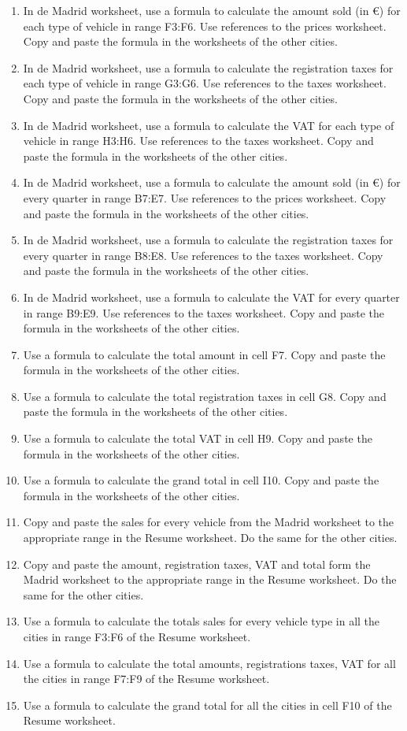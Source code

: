 \begin{enumerate}[leftmargin=*,resume]
\begin{enumerate}
\item In de Madrid worksheet, use a formula to calculate the amount sold (in €) for each type of vehicle in range F3:F6.
Use references to the prices worksheet. 
Copy and paste the formula in the worksheets of the other cities. 
\item In de Madrid worksheet, use a formula to calculate the registration taxes for each type of vehicle in range G3:G6.
Use references to the taxes worksheet. 
Copy and paste the formula in the worksheets of the other cities.
\item In de Madrid worksheet, use a formula to calculate the VAT for each type of vehicle in range H3:H6.
Use references to the taxes worksheet. 
Copy and paste the formula in the worksheets of the other cities.
\item In de Madrid worksheet, use a formula to calculate the amount sold (in €) for every quarter in range
B7:E7.
Use references to the prices worksheet. 
Copy and paste the formula in the worksheets of the other cities.
\item In de Madrid worksheet, use a formula to calculate the registration taxes for every quarter in range
B8:E8.
Use references to the taxes worksheet. 
Copy and paste the formula in the worksheets of the other cities.
\item In de Madrid worksheet, use a formula to calculate the VAT for every quarter in range
B9:E9.
Use references to the taxes worksheet. 
Copy and paste the formula in the worksheets of the other cities.
\item Use a formula to calculate the total amount in cell F7.
Copy and paste the formula in the worksheets of the other cities.  
\item Use a formula to calculate the total registration taxes in cell G8.
Copy and paste the formula in the worksheets of the other cities.  
\item Use a formula to calculate the total VAT in cell H9.
Copy and paste the formula in the worksheets of the other cities. 
\item Use a formula to calculate the grand total in cell I10.
Copy and paste the formula in the worksheets of the other cities.
\item Copy and paste the sales for every vehicle from the Madrid worksheet to the appropriate range in the Resume
worksheet.
Do the same for the other cities.  
\item Copy and paste the amount, registration taxes, VAT and total form the Madrid worksheet to the appropriate
range in the Resume worksheet. 
Do the same for the other cities. 
\item Use a formula to calculate the totals sales for every vehicle type in all the cities in range F3:F6 of the Resume
worksheet. 
\item Use a formula to calculate the total amounts, registrations taxes, VAT for all the cities in range F7:F9 of the
Resume worksheet. 
\item Use a formula to calculate the grand total for all the cities in cell F10 of the Resume worksheet. 
\end{enumerate} 


\end{enumerate}